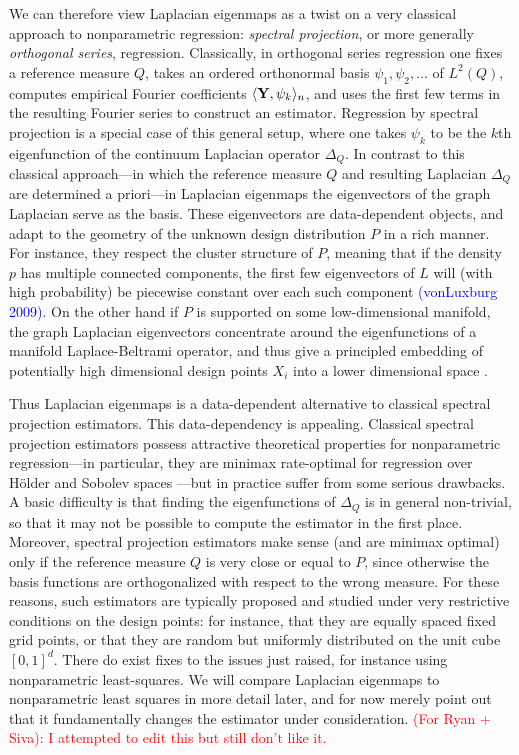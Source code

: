 \documentclass{article}
\newcommand{\1}{\mathbf{1}}
\newcommand{\dotp}[2]{\langle #1, #2 \rangle}
\theoremstyle{alden}
\theoremstyle{aldenthm}
\theoremstyle{definition}
\theoremstyle{remark}
\begin{document}
We can therefore view Laplacian eigenmaps as a twist on a very classical approach to nonparametric regression: \emph{spectral projection}, or more generally \emph{orthogonal series}, regression. Classically, in orthogonal series regression one fixes a reference measure $Q$, takes an ordered orthonormal basis $\psi_1,\psi_2,\ldots$ of $L^2(Q)$, computes empirical Fourier coefficients $\dotp{{\bf Y}}{\psi_k}_n$, and uses the first few terms in the resulting Fourier series to construct an estimator. Regression by spectral projection is a special case of this general setup, where one takes $\psi_k$ to be the $k$th eigenfunction of the continuum Laplacian operator $\Delta_Q$. In contrast to this classical approach---in which the reference measure $Q$ and resulting Laplacian $\Delta_Q$ are determined a priori---in Laplacian eigenmaps the eigenvectors of the graph Laplacian serve as the basis. These eigenvectors are data-dependent objects, and adapt to the geometry of the unknown design distribution $P$ in a rich manner. For instance, they respect the cluster structure of $P$, meaning that if the density $p$ has multiple connected components, the first few eigenvectors of $L$ will (with high probability) be piecewise constant over each such component \textcolor{blue}{(vonLuxburg 2009)}. On the other hand if $P$ is supported on some low-dimensional manifold, the graph Laplacian eigenvectors concentrate around the eigenfunctions of a manifold Laplace-Beltrami operator, and thus give a principled embedding of potentially high dimensional design points $X_i$ into a lower dimensional space \citep{belkin03a}.

Thus Laplacian eigenmaps is a data-dependent alternative to classical spectral projection estimators. This data-dependency is appealing. Classical spectral projection estimators possess attractive theoretical properties for nonparametric regression---in particular, they are minimax rate-optimal for regression over H\"{o}lder and Sobolev spaces \cite{tsybakov08,johnstone2011,gine16}---but in practice suffer from some serious drawbacks. A basic difficulty is that finding the eigenfunctions of $\Delta_Q$ is in general non-trivial, so that it may not be possible to compute the estimator in the first place. Moreover, spectral projection estimators make sense (and are minimax optimal) only if the reference measure $Q$ is very close or equal to $P$, since otherwise the basis functions are orthogonalized with respect to the wrong measure. For these reasons, such estimators are typically proposed and studied under very restrictive conditions on the design points: for instance, that they are equally spaced fixed grid points, or that they are random but uniformly distributed on the unit cube $[0,1]^d$. There do exist fixes to the issues just raised, for instance using nonparametric least-squares. We will compare Laplacian eigenmaps to nonparametric least squares in more detail later, and for now merely point out that it fundamentally changes the estimator under consideration.  \textcolor{red}{(For Ryan + Siva): I attempted to edit this but still don't like it.}
\end{document}

